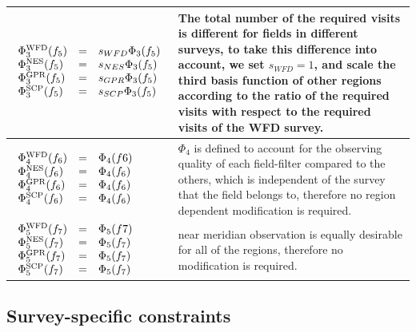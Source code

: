 \documentclass[12pt,aas_macros]{article}
\theoremstyle{definition}
\begin{document}
\begin{table}[h!]
\begin{tabularx}{\textwidth}{| X | X |}
$\begin{array}{l c l}\Phi_3^{\text{WFD}}(f_5) &=& s_{WFD} \Phi_3(f_5)\\ \Phi_3^{\text{NES}}(f_5) &=& s_{NES} \Phi_3(f_5)\\ \Phi_3^{\text{GPR}}(f_5) &=& s_{GPR} \Phi_3(f_5)\\\Phi_3^{\text{SCP}}(f_5) &=& s_{SCP} \Phi_3(f_5)\end{array}$ 

& The total number of the required visits is different for fields in different surveys, to take this difference into account, we set $s_{WFD} = 1$, and scale the third basis function of other regions according to the ratio of the required visits with respect to the required visits of the WFD survey.\\ \hline

$\begin{array}{l c l}\Phi_4^{\text{WFD}}(f_6) &=& \Phi_4(f6)\\ \Phi_4^{\text{NES}}(f_6) &=&\Phi_4(f_6)\\ \Phi_4^{\text{GPR}}(f_6) &=& \Phi_4(f_6)\\\Phi_4^{\text{SCP}}(f_6) &=&\Phi_4(f_6)\end{array}$  

& $\Phi_4$ is defined to account for the observing quality of each field-filter compared to the others, which is independent of the survey that the field belongs to, therefore no region dependent modification is required.\\ \hline
 
$\begin{array}{l c l}\Phi_5^{\text{WFD}}(f_7) &=& \Phi_5(f7)\\ \Phi_5^{\text{NES}}(f_7) &=&\Phi_5(f_7)\\ \Phi_5^{\text{GPR}}(f_7) &=& \Phi_5(f_7)\\\Phi_5^{\text{SCP}}(f_7) &=&\Phi_5(f_7)\end{array}$  
& near meridian observation is equally desirable for all of the regions, therefore no modification is required. \\ \hline

\end{tabularx}
\end{table}


\subsection{Survey-specific constraints}\label{sec_cstr}
\end{document}
